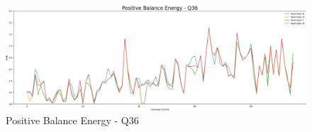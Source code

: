 \begin{figure}[!h]
	\includegraphics[width=1\linewidth]{pictures/results/Positive Balance Energy - Q36.png}
	\caption{Positive Balance Energy - Q36}
	\label{fig:Positive Balance Energy - Q36}
\end{figure}
